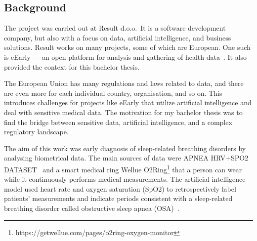 \subsection{Background}

The project was carried out at Result d.o.o.\ It is a software development company, but also with a focus on data, artificial intelligence, and business solutions. Result works on many projects, some of which are European. One such is eEarly --- an open platform for analysis and gathering of health data~\cite{EEarly}. It also provided the context for this bachelor thesis.

The European Union has many regulations and laws related to data, and there are even more for each individual country, organisation, and so on. This introduces challenges for projects like eEarly that utilize artificial intelligence and deal with sensitive medical data. The motivation for my bachelor thesis was to find the bridge between sensitive data, artificial intelligence, and a complex regulatory landscape.

The aim of this work was early diagnosis of sleep-related breathing disorders by analysing biometrical data. The main sources of data were APNEA HRV+SPO2 DATASET~\cite{julia-serdaAPNEAHRV+SPO2DATASET2023} and a smart medical ring Wellue O2Ring\footnote{https://getwellue.com/pages/o2ring-oxygen-monitor} that a person can wear while it continuously performs medical measurements. The artificial intelligence model used heart rate and oxygen saturation (SpO2) to retrospectively label patients' measurements and indicate periods consistent with a sleep-related breathing disorder called obstructive sleep apnea (OSA)~\cite{strolloObstructiveSleepApnea1996}.


